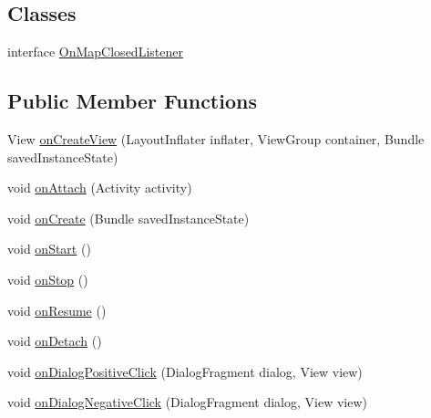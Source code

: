 \subsection*{Classes}
\begin{DoxyCompactItemize}
\item 
interface \hyperlink{interfaceuk_1_1ac_1_1swan_1_1digitaltrails_1_1fragments_1_1_map_fragment_1_1_on_map_closed_listener}{On\+Map\+Closed\+Listener}
\end{DoxyCompactItemize}
\subsection*{Public Member Functions}
\begin{DoxyCompactItemize}
\item 
View \hyperlink{classuk_1_1ac_1_1swan_1_1digitaltrails_1_1fragments_1_1_map_fragment_accdc9c431f216d3a03431166e3f30379}{on\+Create\+View} (Layout\+Inflater inflater, View\+Group container, Bundle saved\+Instance\+State)
\item 
void \hyperlink{classuk_1_1ac_1_1swan_1_1digitaltrails_1_1fragments_1_1_map_fragment_a6a6827601a5638cc3b97485ccdaf2c86}{on\+Attach} (Activity activity)
\item 
void \hyperlink{classuk_1_1ac_1_1swan_1_1digitaltrails_1_1fragments_1_1_map_fragment_a8f08a9164d00020e32e548275fb6adda}{on\+Create} (Bundle saved\+Instance\+State)
\item 
void \hyperlink{classuk_1_1ac_1_1swan_1_1digitaltrails_1_1fragments_1_1_map_fragment_acf60cc97f0903a4f54364d0ed20ded0a}{on\+Start} ()
\item 
void \hyperlink{classuk_1_1ac_1_1swan_1_1digitaltrails_1_1fragments_1_1_map_fragment_ae53e878189d7ffea07e78226f6fa3942}{on\+Stop} ()
\item 
void \hyperlink{classuk_1_1ac_1_1swan_1_1digitaltrails_1_1fragments_1_1_map_fragment_a7f0fb317a760690795c0d15d3d11455e}{on\+Resume} ()
\item 
void \hyperlink{classuk_1_1ac_1_1swan_1_1digitaltrails_1_1fragments_1_1_map_fragment_ab43bdfbec6736493961b1d8e24edc57f}{on\+Detach} ()
\item 
void \hyperlink{classuk_1_1ac_1_1swan_1_1digitaltrails_1_1fragments_1_1_map_fragment_aa25573f8e27a54fe101d91bd2d9e1132}{on\+Dialog\+Positive\+Click} (Dialog\+Fragment dialog, View view)
\item 
void \hyperlink{classuk_1_1ac_1_1swan_1_1digitaltrails_1_1fragments_1_1_map_fragment_a920e326c6b097efbd39d04d0f3a0207e}{on\+Dialog\+Negative\+Click} (Dialog\+Fragment dialog, View view)

\end{DoxyCompactItemize}
